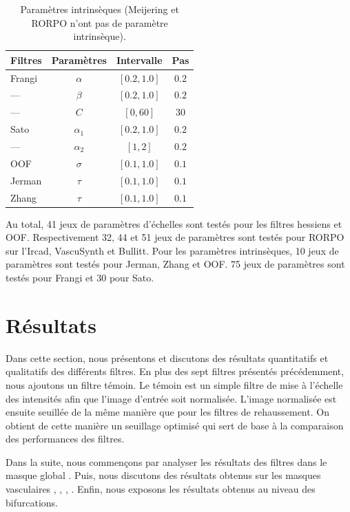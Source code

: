 \begin{table}[H]
  \caption{Paramètres intrinsèques (Meijering et RORPO n'ont pas de paramètre intrinsèque).}
  \label{table:PS_interval}
  \begin{center}
    \begin{tabular}{  l  c  c  c }
      \hline
      Filtres & Paramètres & Intervalle & Pas \\
      \hline
      Frangi & $\alpha$ & $[0.2,1.0]$ & $0.2$ \\
      ---       & $\beta$ & $[0.2,1.0]$ & $0.2$  \\
      ---       & $C$& $[0,60]$ & $30$ \\
      Sato & $\alpha_{1}$ & $[0.2,1.0]$ & $0.2$ \\
      ---     & $\alpha_{2}$ & $[1,2]$ & $0.2$ \\
      OOF & $\sigma$ & $[0.1,1.0]$ & $0.1$ \\
      Jerman & $\tau$ & $[0.1,1.0]$ & $0.1$ \\
      Zhang & $\tau$& $[0.1,1.0]$ & $0.1$ \\
      \hline
    \end{tabular}
  \end{center}
\end{table}
  
Au total, 41 jeux de paramètres d'échelles sont testés pour les filtres hessiens et OOF. Respectivement 32, 44 et 51 jeux de paramètres sont testés pour RORPO sur l'Ircad, VascuSynth et Bullitt. Pour les paramètres intrinsèques, 10 jeux de paramètres sont testés pour Jerman, Zhang et OOF. 75 jeux de paramètres sont testés pour Frangi et 30 pour Sato.


\section{Résultats}

Dans cette section, nous présentons et discutons des résultats quantitatifs et qualitatifs des différents filtres. En plus des sept filtres présentés précédemment, nous ajoutons un filtre témoin. Le témoin est un simple filtre de mise à l'échelle des intensités afin que l'image d'entrée soit normalisée. L'image normalisée est ensuite seuillée de la même manière que pour les filtres de rehaussement. On obtient de cette manière un seuillage optimisé qui sert de base à la comparaison des performances des filtres.

Dans la suite, nous commençons par analyser les résultats des filtres dans le masque global \maskglobal. Puis, nous discutons des résultats obtenus sur les masques vasculaires \maskvascular, \maskvesselLarge, \maskvesselMedium, \maskvesselSmall. Enfin, nous exposons les résultats obtenus au niveau des bifurcations.

